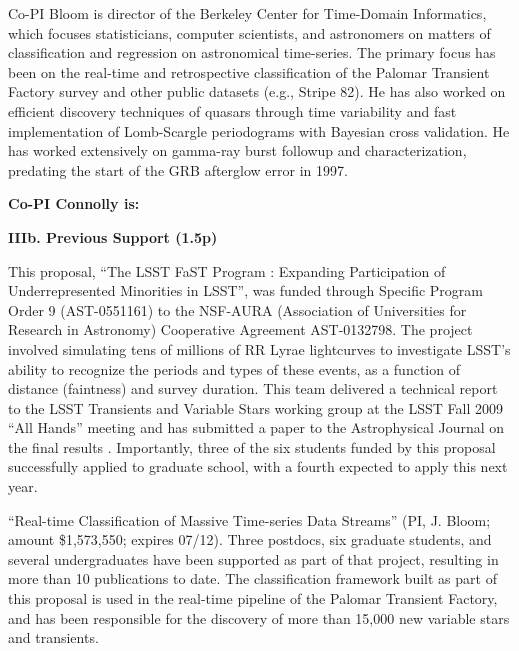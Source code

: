  \smallskip

Co-PI Bloom is director of the Berkeley Center for Time-Domain Informatics, which focuses statisticians, computer scientists, and astronomers on matters of classification and regression on astronomical time-series.  The primary focus has been on the real-time and retrospective classification of the Palomar Transient Factory survey and other public datasets (e.g., Stripe 82). He has also worked on efficient discovery techniques of quasars through time variability and fast implementation of Lomb-Scargle periodograms with Bayesian cross validation. He has worked extensively on gamma-ray burst followup and characterization, predating the start of the GRB afterglow error in 1997.

 \smallskip

{\bf Co-PI Connolly is:}

\bigskip \centerline{\bf IIIb. Previous Support (1.5p)} \smallskip

\smallskip

This proposal, ``The LSST FaST Program : Expanding Participation of
Underrepresented Minorities in LSST'', was funded through Specific Program Order
9 (AST-0551161) to the NSF-AURA (Association of Universities for Research in
Astronomy) Cooperative Agreement AST-0132798.  The project involved simulating
tens of millions of RR Lyrae lightcurves to investigate LSST's ability to
recognize the periods and types of these events, as a function of distance
(faintness) and survey duration.  This team delivered a technical report to the
LSST Transients and Variable Stars working group at the LSST Fall 2009 ``All
Hands'' meeting and has submitted a paper to the Astrophysical Journal on the
final results \citep{RRLyrae}.  Importantly, three of the six students funded by
this proposal successfully applied to graduate school, with a fourth expected to
apply this next year.

 \smallskip

``Real-time Classification of Massive Time-series Data Streams'' (PI, J. Bloom;
amount \$1,573,550; expires 07/12).  Three postdocs, six graduate students, and
several undergraduates have been supported as part of that project, resulting in
more than 10 publications to date.  The classification framework built as part
of this proposal is used in the real-time pipeline of the Palomar Transient
Factory, and has been responsible for the discovery of more than 15,000 new
variable stars and transients.


